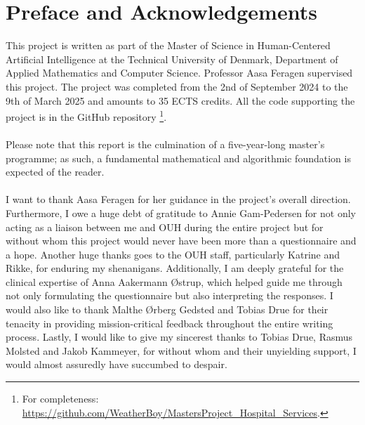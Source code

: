 \section*{Preface and Acknowledgements}
This project is written as part of the Master of Science in Human-Centered Artificial Intelligence at the Technical University of Denmark, Department of Applied Mathematics and Computer Science. Professor Aasa Feragen supervised this project. The project was completed from the 2nd of September 2024 to the 9th of March 2025 and amounts to 35 ECTS credits. All the code supporting the project is in the GitHub repository \footnote{For completeness: \href{https://github.com/WeatherBoy/MastersProject_Hospital_Services}{https://github.com/WeatherBoy/MastersProject\_Hospital\_Services}.}.
\\
\\
Please note that this report is the culmination of a five-year-long master's programme; as such, a fundamental mathematical and algorithmic foundation is expected of the reader.
\\
\\
I want to thank Aasa Feragen for her guidance in the project's overall direction. Furthermore, I owe a huge debt of gratitude to Annie Gam-Pedersen for not only acting as a liaison between me and OUH during the entire project but for without whom this project would never have been more than a questionnaire and a hope. Another huge thanks goes to the OUH staff, particularly Katrine and Rikke, for enduring my shenanigans. Additionally, I am deeply grateful for the clinical expertise of Anna Aakermann \O strup, which helped guide me through not only formulating the questionnaire but also interpreting the responses.
I would also like to thank Malthe \O rberg Gedsted and Tobias Drue for their tenacity in providing mission-critical feedback throughout the entire writing process.
Lastly, I would like to give my sincerest thanks to Tobias Drue, Rasmus Molsted and Jakob Kammeyer, for without whom and their unyielding support, I would almost assuredly have succumbed to despair.